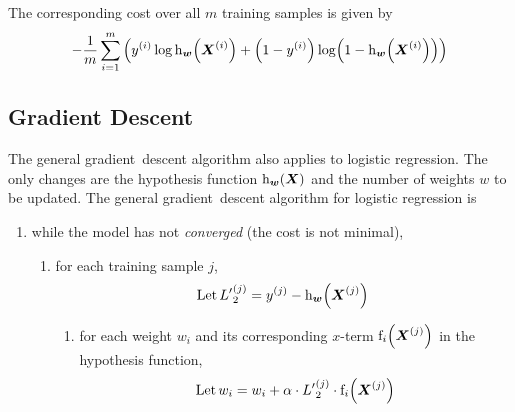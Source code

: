 The corresponding cost over all \( m \) training samples is given by
\begin{equation*}
  - \frac{1}{m} \sum_{i=1}^{m} \left( y^{(i)} \log \function[_{\boldsymbol{w}}]{h}{\boldsymbol{X}^{(i)}} + \left( 1 - y^{(i)} \right) \function{\log}{1 - \function[_{\boldsymbol{w}}]{h}{\boldsymbol{X}^{(i)}}} \right)
\end{equation*}

\subsection{Gradient Descent}

The general gradient~descent algorithm also applies to logistic regression.
The only changes are the hypothesis function \( \function[_{\boldsymbol{w}}]{h}{\boldsymbol{X}} \) and the number of weights \( w \) to be updated.
The general gradient~descent algorithm for logistic regression is
\begin{enumerate}
  \item while the model has not \emph{converged} (the cost is not minimal),
  \begin{enumerate}
    \item for each training sample \( j \),
    \begin{equation*}
      \text{Let}\, {L^{\prime}}_{2}^{(j)} = y^{(j)} - \function[_{\boldsymbol{w}}]{h}{\boldsymbol{X}^{(j)}} \\
    \end{equation*}
    \begin{enumerate}
      \item for each weight \( w_{i} \) and its corresponding \( x \)-term \( \function[_{i}]{f}{\boldsymbol{X}^{(j)}} \) in the hypothesis function,
      \begin{equation*}
        \text{Let}\, w_{i} = w_{i} + \alpha \cdot  {L^{\prime}}_{2}^{(j)} \cdot \function[_{i}]{f}{\boldsymbol{X}^{(j)}}
      \end{equation*}
    \end{enumerate}
  \end{enumerate}
\end{enumerate}
